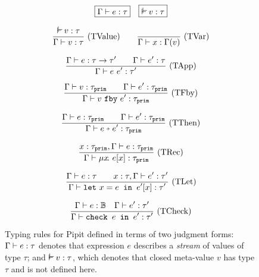 \begin{figure}
  \[
    \boxed{\typing{\Gamma}{e}{\tau}}
    \quad
    \boxed{\mtyping{}{v}{\tau}}
  \]

  \[
    \ruleIN{
      \mtyping{}{v}{\tau}
    }{
      \typing{\Gamma}{v}{\tau}
    }{TValue}
    \quad
    \ruleAx{\typing{\Gamma}{x}{\Gamma(v)}}{TVar}
  \]

  \[
    \enskip \frac {\displaystyle 
      \Gamma \vdash e : \tau \to \tau'
      \qquad
      \Gamma \vdash e' : \tau
    } {\displaystyle \Gamma \vdash e~e' : \tau'} \  \mbox{(TApp)} \enskip
  \]

  \[
    \enskip \frac {\displaystyle 
      \Gamma \vdash v : \tau_{\texttt{prim}}
      \qquad
      \Gamma \vdash e' : \tau_{\texttt{prim}}
    } {\displaystyle 
      \Gamma \vdash v~\texttt{fby}~e' : \tau_{\texttt{prim}}
    } \  \mbox{(TFby)} \enskip
  \]

  \[
    \ruleIN{
      \typing{\Gamma}{e}{\primty}
      \qquad
      \typing{\Gamma}{e'}{\primty}
    }{\typing{\Gamma}{\xthen{e}{e'}}{\primty}}{TThen}
  \]

  \[
    \enskip \frac {\displaystyle 
      x : \tau_{\texttt{prim}}, \Gamma \vdash e : \tau_{\texttt{prim}}
    } {\displaystyle 
      \Gamma \vdash \mu{} x \!.~e[x] : \tau_{\texttt{prim}}
    } \  \mbox{(TRec)} \enskip
  \]

  \[
    \enskip \frac {\displaystyle 
      \Gamma \vdash e : \tau
      \qquad
      x : \tau, \Gamma \vdash e' : \tau'
    } {\displaystyle 
      \Gamma \vdash \texttt{let}~x = e \texttt{~in~} e'[x] : \tau'
    } \  \mbox{(TLet)} \enskip
  \]

  \[
    \enskip \frac {\displaystyle 
      \Gamma \vdash e : \mathbb{B}
      \quad
      \Gamma \vdash e' : \tau'
    } {\displaystyle 
      \Gamma \vdash \texttt{check~} e \texttt{~in~} e' : \tau'
    } \  \mbox{(TCheck)} \enskip
  \]

  \caption{Typing rules for Pipit defined in terms of two judgment forms: $\Gamma \vdash e : \tau$ denotes that expression $e$ describes a \emph{stream} of values of type $\tau$; and $\mtyping{}{v}{\tau}$, which denotes that closed meta-value $v$ has type $\tau$ and is not defined here.}\label{f:core-typing}
\end{figure}